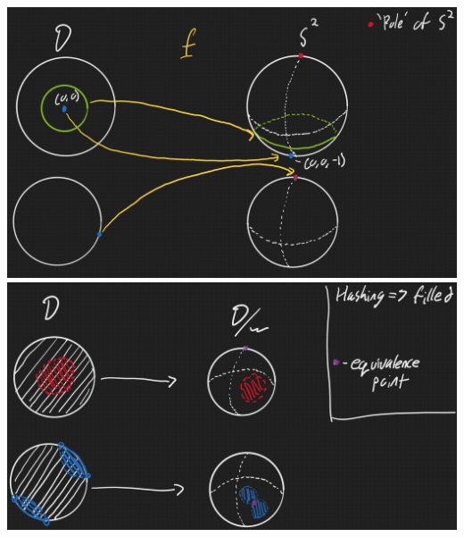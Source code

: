 \begin{solution}
    \begin{center}
    \includegraphics[scale=0.4]{ps7p222.JPG}
    \includegraphics[scale=0.4]{ps7p2.JPG}
    \end{center}

\end{solution}